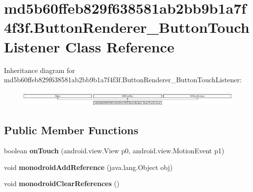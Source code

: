 \hypertarget{classmd5b60ffeb829f638581ab2bb9b1a7f4f3f_1_1ButtonRenderer__ButtonTouchListener}{}\section{md5b60ffeb829f638581ab2bb9b1a7f4f3f.\+Button\+Renderer\+\_\+\+Button\+Touch\+Listener Class Reference}
\label{classmd5b60ffeb829f638581ab2bb9b1a7f4f3f_1_1ButtonRenderer__ButtonTouchListener}
Inheritance diagram for md5b60ffeb829f638581ab2bb9b1a7f4f3f.\+Button\+Renderer\+\_\+\+Button\+Touch\+Listener\+:\begin{figure}[H]
\begin{center}
\leavevmode
\includegraphics[height=0.806336cm]{classmd5b60ffeb829f638581ab2bb9b1a7f4f3f_1_1ButtonRenderer__ButtonTouchListener}
\end{center}
\end{figure}
\subsection*{Public Member Functions}
\begin{DoxyCompactItemize}
\item 
\mbox{\label{classmd5b60ffeb829f638581ab2bb9b1a7f4f3f_1_1ButtonRenderer__ButtonTouchListener_a3fce128bd937b47b24703f5215265222}} 
boolean {\bfseries on\+Touch} (android.\+view.\+View p0, android.\+view.\+Motion\+Event p1)
\item 
\mbox{\label{classmd5b60ffeb829f638581ab2bb9b1a7f4f3f_1_1ButtonRenderer__ButtonTouchListener_a4df5f08247cc553253fcc43ebaf00637}} 
void {\bfseries monodroid\+Add\+Reference} (java.\+lang.\+Object obj)
\item 
\mbox{\label{classmd5b60ffeb829f638581ab2bb9b1a7f4f3f_1_1ButtonRenderer__ButtonTouchListener_a91150dd8f1d697f0ed9ee864c201bc56}} 
void {\bfseries monodroid\+Clear\+References} ()
\end{DoxyCompactItemize}
